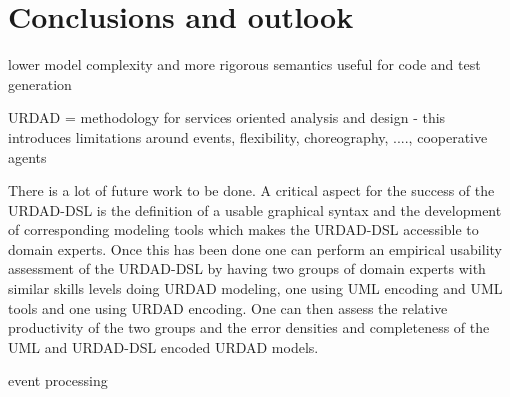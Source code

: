 \section{Conclusions and outlook \label{sec:conclusionsAndOutlook}}

lower model complexity and more rigorous semantics useful for code and test generation

URDAD = methodology for services oriented analysis and design - this introduces limitations around events, flexibility, choreography, ...., cooperative agents

There is a lot of future work to be done. A critical aspect for the success of the URDAD-DSL is the definition of a usable graphical syntax and the development of corresponding modeling tools which makes the URDAD-DSL accessible to domain experts. Once this has been done one can perform an empirical usability assessment of the URDAD-DSL by having two groups of domain experts with similar skills levels doing URDAD modeling, one using UML encoding and UML tools and one using URDAD encoding. One can then assess the relative productivity of the two groups and the error densities and completeness of the UML and URDAD-DSL encoded URDAD models.

event processing